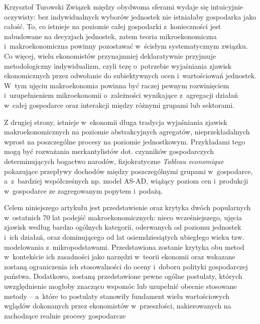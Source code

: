 \begin{artplenv}{Krzysztof Turowski}
Związek między obydwoma sferami wydaje się intuicyjnie oczywisty: bez indywidualnych wyborów jednostek nie istniałaby
gospodarka jako całość. To, co istnieje na poziomie całej gospodarki z~konieczności jest nabudowane na decyzjach
jednostek, zatem teoria mikroekonomiczna i~makroekonomiczna powinny pozostawać w~ścisłym systematycznym związku. Co
więcej, wielu ekonomistów przynajmniej deklaratywnie przyjmuje metodologiczny indywidualizm, czyli tezę o~potrzebie
wyjaśniania zjawisk ekonomicznych przez odwołanie do subiektywnych ocen i~wartościowań jednostek.  W~tym ujęciu
makroekonomia powinna być raczej pewnym rozwinięciem i~uzupełnieniem mikroekonomii o~zależności wynikające z~agregacji
działań w~całej gospodarce oraz interakcji między różnymi grupami lub sektorami.

Z drugiej strony, istnieje w~ekonomii długa tradycja wyjaśniania zjawisk makroekonomicznych na poziomie abstrakcyjnych
agregatów, nieprzekładalnych wprost na poszczególne procesy na poziomie jednostkowym. Przykładami tego mogą być
rozważania merkantylistów dot. czynników gospodarczych determinujących bogactwo narodów, fizjokratyczne \textit{Tableau
economique} pokazujące przepływy dochodów między poszczególnymi grupami w~gospodarce, a~z~bardziej współcześnych np.
model AS-AD, wiążący poziom cen i~produkcji w~gospodarce ze zagregowanym popytem i~podażą.

Celem niniejszego artykułu jest przedstawienie oraz krytyka dwóch popularnych w~ostatnich 70 lat podejść
makroekonomicznych: nieco wcześniejszego, ujęcia zjawisk według bardzo ogólnych kategorii, oderwanych od poziomu
jednostek i~ich działań, oraz dominującego od lat osiemdziesiątych ubiegłego wieku tzw. modelowania z~mikropodstawami.
Przedstawiona zostanie krytyka obu metod w~kontekście ich zasadności jako narzędzi w~teorii ekonomii oraz wskazane
zostaną ograniczenia ich stosowalności do oceny i~doboru polityki gospodarczej państwa. Dodatkowo, zostaną
przedstawione pewne ogólne postulaty, których uwzględnienie mogłoby znacząco wspomóc lub uzupełnić obecnie stosowane
metody -- a~które to postulaty stanowiły fundament wielu wartościowych wglądów dokonanych przez
ekonomistów w~przeszłości, nakierowanych na zachodzące realnie procesy gospodarcze


\end{artplenv}
